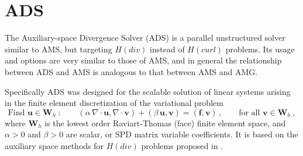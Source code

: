 \section{ADS}
\label{ADS}

The Auxiliary-space Divergence Solver (ADS) is a parallel unstructured solver
similar to AMS, but targeting $H(div)$ instead of $H(curl)$ problems. Its usage
and options are very similar to those of AMS, and in general the relationship
between ADS and AMS is analogous to that between AMS and AMG.

Specifically ADS was designed for the scalable solution of linear systems
arising in the finite element discretization of the variational problem
\begin{equation} \label{ads-hdiv}
\mbox{Find } {\mathbf u} \in {\mathbf W}_h \>:\qquad
(\alpha\, \nabla \cdot {\mathbf u},  \nabla \cdot {\mathbf v}) +
(\beta\, {\mathbf u},  {\mathbf v}) = ({\mathbf f},  {\mathbf v})\,,
\qquad \mbox{for all } {\mathbf v} \in {\mathbf W}_h \,,
\end{equation}
where ${\mathbf W}_h$ is the lowest order Raviart-Thomas (face) finite element
space, and $\alpha>0$ and $\beta>0$ are scalar, or SPD matrix variable
coefficients.  It is based on the auxiliary space methods for $H(div)$ problems
proposed in \cite{xu_H_curl}.

